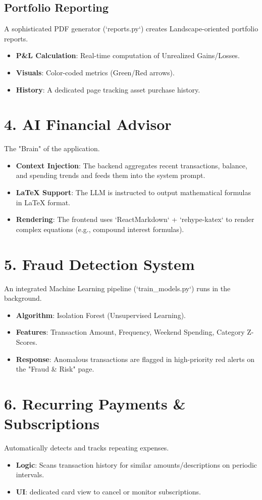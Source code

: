 \documentclass[12pt, a4paper]{report}
\begin{document}
\subsection{Portfolio Reporting}
A sophisticated PDF generator (`reports.py`) creates Landscape-oriented portfolio reports.
\begin{itemize}
    \item \textbf{P\&L Calculation}: Real-time computation of Unrealized Gains/Losses.
    \item \textbf{Visuals}: Color-coded metrics (Green/Red arrows).
    \item \textbf{History}: A dedicated page tracking asset purchase history.
\end{itemize}

\section{4. AI Financial Advisor}
The "Brain" of the application.
\begin{itemize}
    \item \textbf{Context Injection}: The backend aggregates recent transactions, balance, and spending trends and feeds them into the system prompt.
    \item \textbf{LaTeX Support}: The LLM is instructed to output mathematical formulas in LaTeX format.
    \item \textbf{Rendering}: The frontend uses `ReactMarkdown` + `rehype-katex` to render complex equations (e.g., compound interest formulas).
\end{itemize}

\section{5. Fraud Detection System}
An integrated Machine Learning pipeline (`train_models.py`) runs in the background.
\begin{itemize}
    \item \textbf{Algorithm}: Isolation Forest (Unsupervised Learning).
    \item \textbf{Features}: Transaction Amount, Frequency, Weekend Spending, Category Z-Scores.
    \item \textbf{Response}: Anomalous transactions are flagged in high-priority red alerts on the "Fraud & Risk" page.
\end{itemize}

\section{6. Recurring Payments & Subscriptions}
Automatically detects and tracks repeating expenses.
\begin{itemize}
    \item \textbf{Logic}: Scans transaction history for similar amounts/descriptions on periodic intervals.
    \item \textbf{UI}: dedicated card view to cancel or monitor subscriptions.
\end{itemize}
\end{document}
